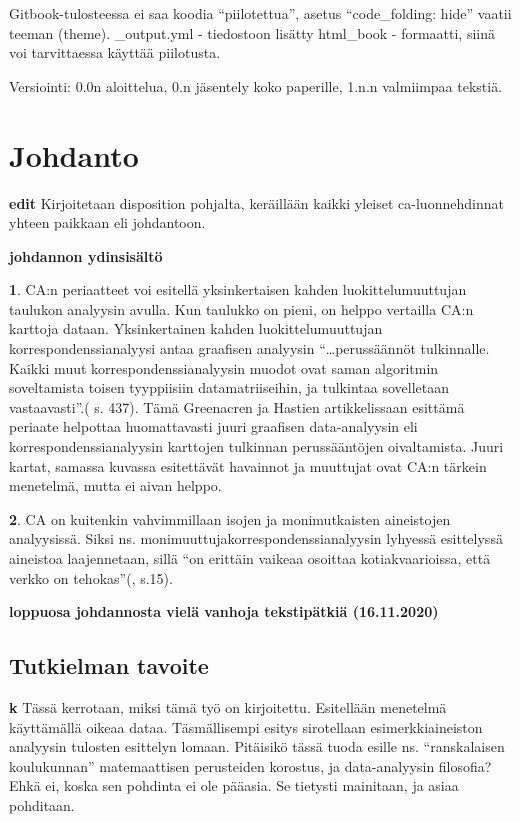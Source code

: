 \documentclass[
  finnish,
]{book}
\begin{document}
Gitbook-tulosteessa ei saa koodia ``piilotettua'', asetus ``code\_folding: hide'' vaatii
teeman (theme). \_output.yml - tiedostoon lisätty html\_book - formaatti, siinä
voi tarvittaessa käyttää piilotusta.

Versiointi: 0.0n aloittelua, 0.n jäsentely koko paperille, 1.n.n valmiimpaa tekstiä.

\hypertarget{johdanto}{%
\chapter{Johdanto}\label{johdanto}}

\textbf{edit} Kirjoitetaan disposition pohjalta, keräillään kaikki yleiset
ca-luonnehdinnat yhteen paikkaan eli johdantoon.

\textbf{johdannon ydinsisältö}

\textbf{1}. CA:n periaatteet voi esitellä yksinkertaisen kahden luokittelumuuttujan
taulukon analyysin avulla. Kun taulukko on pieni, on helppo vertailla CA:n
karttoja dataan. Yksinkertainen kahden luokittelumuuttujan
korrespondenssianalyysi antaa graafisen analyysin ``\ldots perussäännöt
tulkinnalle. Kaikki muut korrespondenssianalyysin muodot ovat saman algoritmin
soveltamista toisen tyyppiisiin datamatriiseihin, ja tulkintaa sovelletaan vastaavasti''.(\citep{RefWorks:doc:5a857a44e4b0ed2d44664d84} s. 437). Tämä Greenacren ja Hastien artikkelissaan
esittämä periaate helpottaa huomattavasti juuri graafisen data-analyysin
eli korrespondenssianalyysin karttojen tulkinnan perussääntöjen oivaltamista. Juuri kartat,
samassa kuvassa esitettävät havainnot ja muuttujat ovat CA:n tärkein menetelmä, mutta ei
aivan helppo.

\textbf{2}. CA on kuitenkin vahvimmillaan isojen ja monimutkaisten aineistojen analyysissä.
Siksi ns. monimuuttujakorrespondenssianalyysin lyhyessä esittelyssä aineistoa
laajennetaan, sillä ``on erittäin vaikeaa osoittaa kotiakvaarioissa, että verkko on
tehokas''(\citep{RefWorks:doc:5a857a43e4b0ed2d44664d75}, s.15).

\textbf{loppuosa johdannosta vielä vanhoja tekstipätkiä (16.11.2020)}

\hypertarget{tutkielman-tavoite}{%
\section{Tutkielman tavoite}\label{tutkielman-tavoite}}

\textbf{k} Tässä kerrotaan, miksi tämä työ on kirjoitettu. Esitellään menetelmä
käyttämällä oikeaa dataa. Täsmällisempi esitys sirotellaan esimerkkiaineiston
analyysin tulosten esittelyn lomaan. Pitäisikö tässä tuoda esille ns. ``ranskalaisen
koulukunnan'' matemaattisen perusteiden korostus, ja data-analyysin filosofia?
Ehkä ei, koska sen pohdinta ei ole pääasia. Se tietysti mainitaan, ja asiaa pohditaan.
\end{document}

